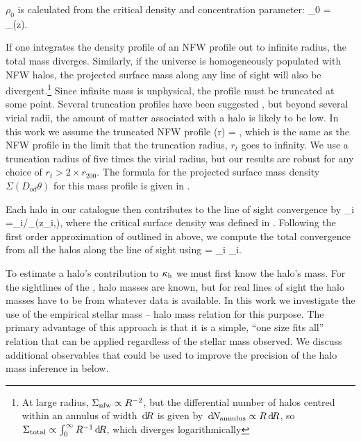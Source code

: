 \documentclass[useAMS,usenatbib]{mn2e}
\begin{document}
$\rho_0$ is calculated from the critical density and concentration parameter:
\be
\rho_0 = \rho_{}(z).
\ee

If one integrates the density profile of an NFW profile out to infinite
radius, the total mass diverges. Similarly, if the universe is
homogeneously populated with NFW halos, the projected surface mass along
any line of sight will also be divergent.\footnote{At large radius,
$\Sigma_{\rm nfw} \propto R^{-2}$, but the differential number of halos
centred within an annulus of width $\, \mathrm{d} \! R$ is given by $\, \mathrm{d} \! N_{\rm
annulus} \propto R \, \mathrm{d} \! R$, so  $\Sigma_{\rm total} \propto
\int_{0}^{\infty} R^{-1} \, \mathrm{d} \! R$, which diverges logarithmically} Since
infinite mass is unphysical, the profile must be truncated at some
point. Several truncation profiles have been suggested
\citep[e.g][]{BMO}, but beyond several virial radii, the amount of
matter associated with a halo is likely to be low. In this work we
assume the truncated NFW profile
\be\label{eq:bmoprofile}
\rho(r) = 
,
\ee
which is the same as the NFW profile in the limit that the truncation
radius, $r_t$ goes to infinity. We use a truncation radius of five times
the virial radius, but our results are robust for any choice of $r_t>2
\times r_{200}$. The formula for the projected surface mass density 
$\Sigma(D_{od}\theta)$ for this
mass profile is given in \citet{BMO}. 

Each halo in our catalogue then contributes to
the line of sight convergence by
\be
\label{eq:kappai}
\kappa_i =\Sigma_{i}/\Sigma_{}(z_i,\zs),
\ee
where the critical surface density was defined in .
Following the first order approximation of \citet{HilbertEtal2009}
outlined in  above, we compute 
the total convergence from all the halos along the line
of sight using
\be 
\label{eq:kappasummu}
\kappah = \sum_{i} \kappa_i.
\ee

To estimate a halo's contribution to $\kappa_{\rm h}$ we must first know the
halo's mass. For the sightlines of the \MS, halo masses are
known, but for  real lines of sight the halo masses have to be \infered
from whatever data is available. 
In this work we investigate the use of the empirical stellar mass --
halo mass relation for this purpose. The primary advantage of this
approach is that it is a simple, ``one size fits all'' relation that can
be applied regardless of the stellar mass observed. We discuss
additional observables that could be used to improve the precision of
the halo mass inference in  below. 
\end{document}
